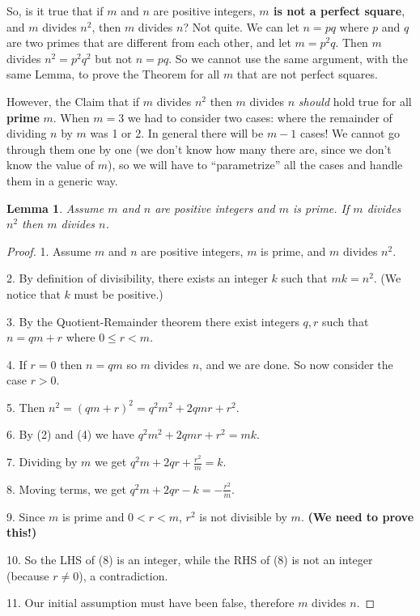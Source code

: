 \documentclass[14pt]{extarticle}
\newtheorem{lemma}{Lemma}
\begin{document}
So, is it true that if $m$ and $n$ are positive integers, \textbf{$m$ is not a perfect square}, and $m$ divides $n^2$, then $m$ divides $n$? Not quite. We can let $n = pq$ where $p$ and $q$ are two primes that are different from each other, and let $m = p^2q$. Then $m$ divides $n^2 = p^2q^2$ but not $n = pq$. So we cannot use the same argument, with the same Lemma, to prove the Theorem for all $m$ that are not perfect squares. 

However, the Claim that if $m$ divides $n^2$ then $m$ divides $n$ \textit{should} hold true for all \textbf{prime} $m$. When $m = 3$ we had to consider two cases: where the remainder of dividing $n$ by $m$ was 1 or 2. In general there will be $m-1$ cases! We cannot go through them one by one (we don't know how many there are, since we don't know the value of $m$), so we will have to ``parametrize'' all the cases and handle them in a generic way.

\begin{lemma}
Assume $m$ and $n$ are positive integers and $m$ is prime. If $m$ divides $n^2$ then $m$ divides $n$.
\end{lemma}

\begin{proof}
1. Assume $m$ and $n$ are positive integers, $m$ is prime, and $m$ divides $n^2$.

2. By definition of divisibility, there exists an integer $k$ such that $mk = n^2$. (We notice that $k$ must be positive.)

3. By the Quotient-Remainder theorem there exist integers $q, r$ such that $n = qm + r$ where $0 \leq r < m$.

4. If $r = 0$ then $n = qm$ so $m$ divides $n$, and we are done. So now consider the case $r > 0$.

5. Then $n^2 = (qm + r)^2 = q^2m^2 + 2qmr + r^2$.

6. By (2) and (4) we have $q^2m^2 + 2qmr + r^2 = mk$.

7. Dividing by $m$ we get $q^2m + 2qr + \frac{r^2}{m} = k$.

8. Moving terms, we get $q^2m + 2qr - k = -\frac{r^2}{m}$.

9. Since $m$ is prime and $0 < r < m$, $r^2$ is not divisible by $m$. \textbf{(We need to prove this!)}

10. So the LHS of (8) is an integer, while the RHS of (8) is not an integer (because $r \neq 0$), a contradiction.

11. Our initial assumption must have been false, therefore $m$ divides $n$.
\end{proof}
\end{document}
